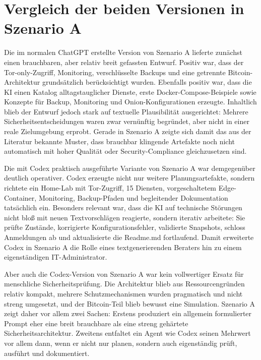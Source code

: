 \section{Vergleich der beiden Versionen in Szenario A}

Die im normalen ChatGPT erstellte Version von Szenario A lieferte zunächst einen brauchbaren, aber relativ breit gefassten Entwurf. Positiv war, dass der Tor-only-Zugriff, Monitoring, verschlüsselte Backups und eine getrennte Bitcoin-Architektur grundsätzlich berücksichtigt wurden. Ebenfalls positiv war, dass die \acs{KI} einen Katalog alltagstauglicher Dienste, erste Docker-Compose-Beispiele sowie Konzepte für Backup, Monitoring und Onion-Konfigurationen erzeugte. Inhaltlich blieb der Entwurf jedoch stark auf textuelle Plausibilität ausgerichtet: Mehrere Sicherheitsentscheidungen waren zwar vernünftig begründet, aber nicht in einer reale Zielumgebung erprobt. Gerade in Szenario A zeigte sich damit das aus der Literatur bekannte Muster, dass brauchbar klingende Artefakte noch nicht automatisch mit hoher Qualität oder Security-Compliance gleichzusetzen sind.\cite{pan2025deployabilitycentriciac,hase2026securitypolicyiac}

Die mit Codex praktisch ausgeführte Variante von Szenario A war demgegenüber deutlich operativer. Codex erzeugte nicht nur weitere Planungsartefakte, sondern richtete ein Home-Lab mit Tor-Zugriff, 15 Diensten, vorgeschaltetem Edge-Container, Monitoring, Backup-Pfaden und begleitender Dokumentation tatsächlich ein. Besonders relevant war, dass die \acs{KI} auf technische Störungen nicht bloß mit neuen Textvorschlägen reagierte, sondern iterativ arbeitete: Sie prüfte Zustände, korrigierte Konfigurationsfehler, validierte Snapshots, schloss Anmeldungen ab und aktualisierte die Readme.md fortlaufend. Damit erweiterte Codex in Szenario A die Rolle eines textgenerierenden Beraters hin zu einem eigenständigen IT-Administrator.

 Aber auch die Codex-Version von Szenario A war kein vollwertiger Ersatz für menschliche Sicherheitsprüfung. Die Architektur blieb aus Ressourcengründen relativ kompakt, mehrere Schutzmechanismen wurden pragmatisch und nicht streng umgesetzt, und der Bitcoin-Teil blieb bewusst eine Simulation. Szenario A zeigt daher vor allem zwei Sachen: Erstens produziert ein allgemein formulierter Prompt eher eine breit brauchbare als eine streng gehärtete Sicherheitsarchitektur. Zweitens entfaltet ein Agent wie Codex seinen Mehrwert vor allem dann, wenn er nicht nur planen, sondern auch eigenständig prüft, ausführt und dokumentiert.

